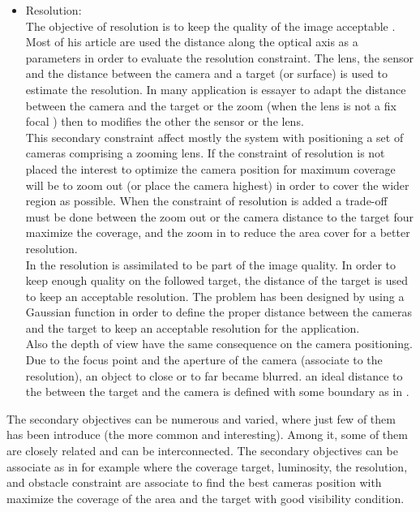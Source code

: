 \begin{itemize}
\\ 
\item  Resolution:\\ The objective of resolution is to keep the quality of the image acceptable \cite{27*bodor2005,33*reddy2012,171*horster2006,152*wang2009,43*erdem2006}. Most of his article are used the distance along the optical axis as a parameters in order to evaluate the resolution constraint. The lens, the sensor and the distance  between the camera  and a target (or surface) is used to estimate the resolution. In many application is essayer to adapt the distance between the camera and the target or the zoom (when the lens is not a fix focal ) then to modifies the other the sensor or the lens.\\
  This secondary constraint affect mostly the system with positioning a set of cameras  comprising a zooming lens. If the constraint of resolution is not placed the interest to optimize the camera position for maximum coverage will be to zoom out (or place the camera highest) in order to cover  the wider region as possible. When the constraint of resolution is added a trade-off must be done between the zoom out or the camera distance to the target four maximize the coverage, and the zoom in to reduce the area cover for a better resolution.\\
   In \cite{33*reddy2012} the resolution is assimilated to be part of the image quality. In order to keep enough quality on the followed target,  the distance of the target is used to keep an acceptable resolution. The problem has been designed by using a Gaussian function in order to define the proper distance between the cameras and the target to keep an acceptable resolution for the application. \\
Also the depth of view have the same consequence on the camera positioning. Due to the focus point and the aperture of the camera (associate to the resolution), an object to close or to far became blurred. an ideal distance to the between the target and the camera is defined with some boundary  as in \cite{193*fu2014}. %


\end{itemize}
The secondary objectives can be numerous and varied, where just few of them has been introduce (the more common and interesting). Among it, some of them are closely related and can be interconnected. The secondary objectives can be associate as in \cite{33*reddy2012} for example where the coverage target, luminosity, the resolution, and obstacle constraint are associate to find the best cameras position with maximize the coverage of the area and the target with good visibility condition. \\
